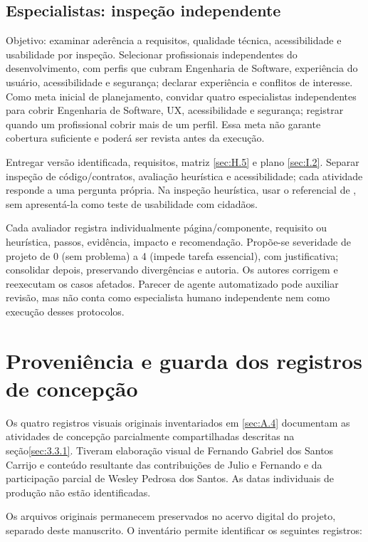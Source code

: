 \begin{apendicesenv}
\section{Especialistas: inspeção independente}
\label{sec:K.3}

Objetivo: examinar aderência a requisitos, qualidade técnica, acessibilidade e usabilidade por inspeção. Selecionar profissionais independentes do desenvolvimento, com perfis que cubram Engenharia de Software, experiência do usuário, acessibilidade e segurança; declarar experiência e conflitos de interesse. Como meta inicial de planejamento, convidar quatro especialistas independentes para cobrir Engenharia de Software, UX, acessibilidade e segurança; registrar quando um profissional cobrir mais de um perfil. Essa meta não garante cobertura suficiente e poderá ser revista antes da execução.

Entregar versão identificada, requisitos, matriz \ref{sec:H.5} e plano \ref{sec:I.2}. Separar inspeção de código/contratos, avaliação heurística e acessibilidade; cada atividade responde a uma pergunta própria. Na inspeção heurística, usar o referencial de , sem apresentá-la como teste de usabilidade com cidadãos.

Cada avaliador registra individualmente página/componente, requisito ou heurística, passos, evidência, impacto e recomendação. Propõe-se severidade de projeto de 0 (sem problema) a 4 (impede tarefa essencial), com justificativa; consolidar depois, preservando divergências e autoria. Os autores corrigem e reexecutam os casos afetados. Parecer de agente automatizado pode auxiliar revisão, mas não conta como especialista humano independente nem como execução desses protocolos.

\chapter{Proveniência e guarda dos registros de concepção}
\label{ap:L}

Os quatro registros visuais originais inventariados em \ref{sec:A.4} documentam as atividades de concepção parcialmente compartilhadas descritas na seção\nobreakspace{}\ref{sec:3.3.1}. Tiveram elaboração visual de Fernando Gabriel dos Santos Carrijo e conteúdo resultante das contribuições de Julio e Fernando e da participação parcial de Wesley Pedrosa dos Santos. As datas individuais de produção não estão identificadas.

Os arquivos originais permanecem preservados no acervo digital do projeto, separado deste manuscrito. O inventário permite identificar os seguintes registros:


\end{apendicesenv}
